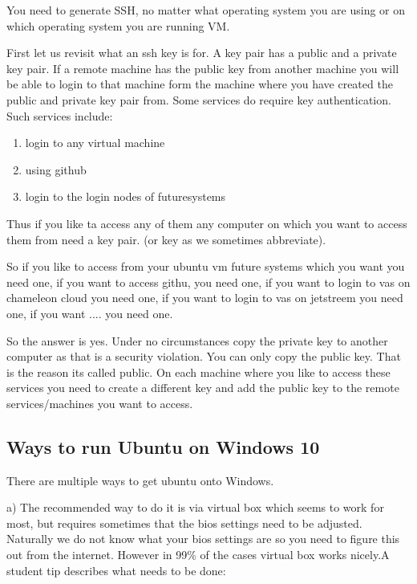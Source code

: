 You need to generate SSH, no matter what operating system you are
using or on which operating system you are running VM.

First let us revisit what an ssh key is for. A key pair has a public
and a private key pair. If a remote machine has the public key from
another machine you will be able to login to that machine form the
machine where you have created the public and private key pair from.
Some services do require key authentication. Such services include:
\begin{enumerate}
\item {} 
login to any virtual machine

\item {} 
using github

\item {} 
login to the login nodes of futuresystems

\end{enumerate}

Thus if you like ta access any of them any computer on which you want
to access them from need a key pair. (or key as we sometimes
abbreviate).

So if you like to access from your ubuntu vm future systems which you
want you need one, if you want to access githu, you need one, if you
want to login to vas on chameleon cloud you need one, if you want to
login to vas on jetstreem you need one, if you want .... you need one.

So the answer is yes. Under no circumstances copy the private key to
another computer as that is a security violation. You can only copy
the public key. That is the reason its called public. On each machine
where you like to access these services you need to create a different
key and add the public key to the remote services/machines you want to
access.


\subsection{Ways to run Ubuntu on Windows 10}
\label{\detokenize{faq:ways-to-run-ubuntu-on-windows-10}}
There are multiple ways to get ubuntu onto Windows.

a) The recommended way to do it is via virtual box which seems to work
for most, but requires sometimes that the bios settings need to be
adjusted. Naturally we do not know what your bios settings are so you
need to figure this out from the internet. However in 99\% of the cases
virtual box works nicely.A student tip describes what needs to be
done:

